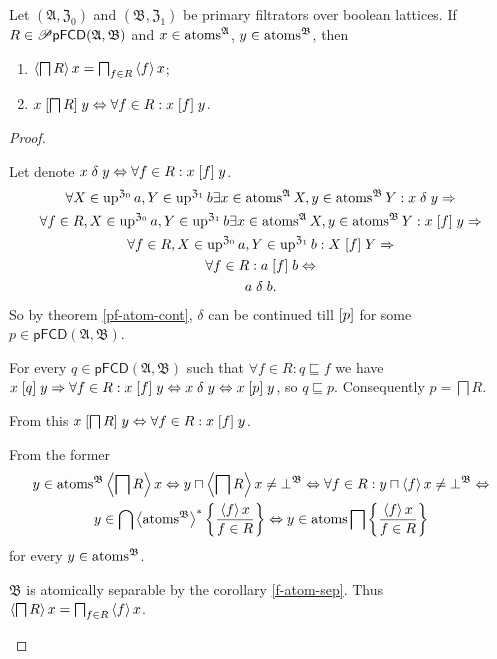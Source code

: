 \begin{thm}
\label{pf-meet-atom}Let $(\mathfrak{A},\mathfrak{Z}_{0})$ and $(\mathfrak{B},\mathfrak{Z}_{1})$
be primary filtrators over boolean lattices. If $R\in\mathscr{P}\mathsf{pFCD}(\mathfrak{A},\mathfrak{B})$
and $x\in\operatorname{atoms}^{\mathfrak{A}}$, $y\in\operatorname{atoms}^{\mathfrak{B}}$, then
\begin{enumerate}
\item \label{pf-meet-at-f}$\left\langle \bigsqcap R\right\rangle x=\bigsqcap_{f\in R}\left\langle f\right\rangle x$;
\item \label{pf-meet-at-r}$x\mathrel{\left[\bigsqcap R\right]}y\Leftrightarrow\forall f\in R:x\mathrel{\left[f\right]}y$.
\end{enumerate}
\end{thm}
\begin{proof}
~
\begin{widedisorder}
\item [{\ref{pf-meet-at-r}}] Let denote $x\mathrel\delta y\Leftrightarrow\forall f\in R:x\mathrel{\left[f\right]}y$.
\begin{gather*}
\forall X\in\operatorname{up}^{\mathfrak{Z}_{0}}a,Y\in\operatorname{up}^{\mathfrak{Z}_{1}}b\exists x\in\operatorname{atoms}^{\mathfrak{A}}X,y\in\operatorname{atoms}^{\mathfrak{B}}Y:x\mathrel\delta y\Rightarrow\\
\forall f\in R,X\in\operatorname{up}^{\mathfrak{Z}_{0}}a,Y\in\operatorname{up}^{\mathfrak{Z}_{1}}b\exists x\in\operatorname{atoms}^{\mathfrak{A}}X,y\in\operatorname{atoms}^{\mathfrak{B}}Y:x\mathrel{\left[f\right]}y\Rightarrow\\
\forall f\in R,X\in\operatorname{up}^{\mathfrak{Z}_{0}}a,Y\in\operatorname{up}^{\mathfrak{Z}_{1}}b:X\mathrel{\left[f\right]}Y\Rightarrow\\
\forall f\in R:a\mathrel{\left[f\right]}b\Leftrightarrow\\
a\mathrel\delta b.
\end{gather*}
So by theorem \ref{pf-atom-cont}, $\delta$ can be continued
till $\mathrel{\left[p\right]}$ for some $p\in\mathsf{pFCD}(\mathfrak{A},\mathfrak{B})$.


For every $q\in\mathsf{pFCD}(\mathfrak{A},\mathfrak{B})$ such that
$\forall f\in R:q\sqsubseteq f$ we have $x\mathrel{\left[q\right]}y\Rightarrow\forall f\in R:x\mathrel{\left[f\right]}y\Leftrightarrow x\mathrel{\delta}y\Leftrightarrow x\mathrel{\left[p\right]}y$,
so $q\sqsubseteq p$. Consequently $p=\bigsqcap R$.


From this $x\mathrel{\left[\bigsqcap R\right]}y\Leftrightarrow\forall f\in R:x\mathrel{\left[f\right]}y$.

\item [{\ref{pf-meet-at-f}}] From the former 
\begin{multline*}
y\in\operatorname{atoms}^{\mathfrak{B}}\left\langle \bigsqcap R\right\rangle x\Leftrightarrow y\sqcap\left\langle \bigsqcap R\right\rangle x\ne\bot^{\mathfrak{B}}\Leftrightarrow\forall f\in R:y\sqcap\left\langle f\right\rangle x\ne\bot^{\mathfrak{B}}\Leftrightarrow\\
y\in\bigcap\left\langle \operatorname{atoms}^{\mathfrak{B}}\right\rangle ^{\ast}\left\{ \frac{\left\langle f\right\rangle x}{f\in R}\right\}\Leftrightarrow y\in\operatorname{atoms}\bigsqcap\left\{ \frac{\left\langle f\right\rangle x}{f\in R}\right\}
\end{multline*}
for every $y\in\operatorname{atoms}^{\mathfrak{B}}$.


$\mathfrak{B}$ is atomically separable by the corollary \ref{f-atom-sep}.
Thus $\left\langle \bigsqcap R\right\rangle x=\bigsqcap_{f\in R}\left\langle f\right\rangle x$.

\end{widedisorder}
\end{proof}

